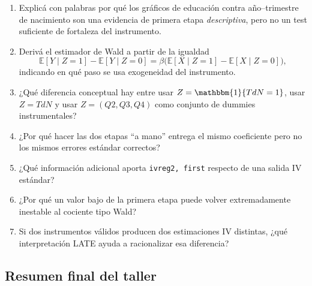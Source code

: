 \documentclass[11pt]{article}
\newcommand{\q}[1]{``#1''}
\newcommand{\E}{\mathbb{E}}
\begin{document}
\begin{enumerate}[leftmargin=1.7em]
    \item Explicá con palabras por qué los gráficos de educación contra año--trimestre de nacimiento son una evidencia de primera etapa \emph{descriptiva}, pero no un test suficiente de fortaleza del instrumento.
    \item Derivá el estimador de Wald a partir de la igualdad
    \[
    \E[Y\mid Z=1]-\E[Y\mid Z=0]
    =
    \beta\big(\E[X\mid Z=1]-\E[X\mid Z=0]\big),
    \]
    indicando en qué paso se usa exogeneidad del instrumento.
    \item ¿Qué diferencia conceptual hay entre usar \(Z=\mathbbm{1}\{TdN=1\}\), usar \(Z=TdN\) y usar \(Z=(Q2,Q3,Q4)\) como conjunto de dummies instrumentales?
    \item ¿Por qué hacer las dos etapas \q{a mano} entrega el mismo coeficiente pero no los mismos errores estándar correctos?
    \item ¿Qué información adicional aporta \texttt{ivreg2, first} respecto de una salida IV estándar?
    \item ¿Por qué un valor bajo de la primera etapa puede volver extremadamente inestable al cociente tipo Wald?
    \item Si dos instrumentos válidos producen dos estimaciones IV distintas, ¿qué interpretación LATE ayuda a racionalizar esa diferencia?
\end{enumerate}

\subsection{Resumen final del taller}
\end{document}
